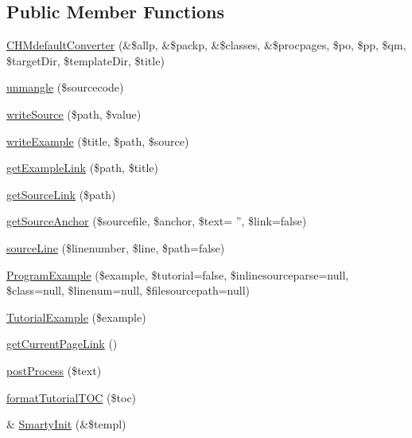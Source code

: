 \subsection*{\-Public \-Member \-Functions}
\begin{DoxyCompactItemize}
\item 
\hyperlink{class_c_h_mdefault_converter_a3e51378649f5bf2432fc2579feece8f3}{\-C\-H\-Mdefault\-Converter} (\&\$allp, \&\$packp, \&\$classes, \&\$procpages, \$po, \$pp, \$qm, \$target\-Dir, \$template\-Dir, \$title)
\item 
\hyperlink{class_c_h_mdefault_converter_ab36840588a8c62493031b9f23c4918c5}{unmangle} (\$sourcecode)
\item 
\hyperlink{class_c_h_mdefault_converter_abd54588ec4cf2a0c5d087031485f932e}{write\-Source} (\$path, \$value)
\item 
\hyperlink{class_c_h_mdefault_converter_a757f70385404e298a4c053d6b7d1be28}{write\-Example} (\$title, \$path, \$source)
\item 
\hyperlink{class_c_h_mdefault_converter_a26b4615e9204cd081dd51fd0367bf4d6}{get\-Example\-Link} (\$path, \$title)
\item 
\hyperlink{class_c_h_mdefault_converter_a606ad911462a36f943313ed5475db5dc}{get\-Source\-Link} (\$path)
\item 
\hyperlink{class_c_h_mdefault_converter_a0cc7c24f111109ea1d8559681ecd6b77}{get\-Source\-Anchor} (\$sourcefile, \$anchor, \$text= '', \$link=false)
\item 
\hyperlink{class_c_h_mdefault_converter_a14f6bc6e9d8bbe09c506108e657b6f87}{source\-Line} (\$linenumber, \$line, \$path=false)
\item 
\hyperlink{class_c_h_mdefault_converter_a50aa5ec756e883826c3c06cf65ce61a5}{\-Program\-Example} (\$example, \$tutorial=false, \$inlinesourceparse=null, \$class=null, \$linenum=null, \$filesourcepath=null)
\item 
\hyperlink{class_c_h_mdefault_converter_aeb023df705aa419245272dd0face61ed}{\-Tutorial\-Example} (\$example)
\item 
\hyperlink{class_c_h_mdefault_converter_a37cda5b82aee3c5062d29b829345ef7e}{get\-Current\-Page\-Link} ()
\item 
\hyperlink{class_c_h_mdefault_converter_a0b2058070d303b4d06535be248b021ab}{post\-Process} (\$text)
\item 
\hyperlink{class_c_h_mdefault_converter_a8207fcf7f5bfbbc02a865ef39b03921a}{format\-Tutorial\-T\-O\-C} (\$toc)
\item 
\& \hyperlink{class_c_h_mdefault_converter_a7ed01c3315cd29f50a08d695548da9ae}{\-Smarty\-Init} (\&\$templ)

\end{DoxyCompactItemize}
